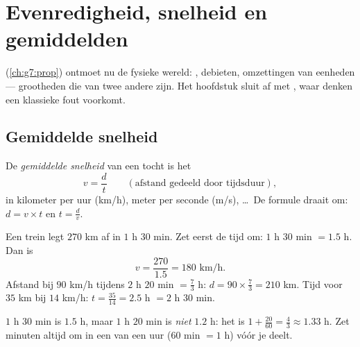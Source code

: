 \chapter{Evenredigheid, snelheid en gemiddelden}\label{ch:g8:speed}

 (\cref{ch:g7:prop}) ontmoet nu de fysieke wereld: ,
debieten, omzettingen van eenheden --- grootheden die \emph{} van twee
andere zijn. Het hoofdstuk sluit af met , waar 
denken een klassieke fout voorkomt.

\section{Gemiddelde snelheid}

\begin{definition}\label{def:g8:speed:def}
De \emph{gemiddelde snelheid} van een tocht is het 
\[
v = \frac{d}{t}
\qquad
\left(\text{afstand gedeeld door tijdsduur}\right),
\]
in kilometer per uur (km/h), meter per seconde (m/s), \dots\ De formule draait
om: $d = v \times t$ en $t = \frac{d}{v}$.
\end{definition}

\begin{example}\label{ex:g8:speed:basic}
Een trein legt $270$ km af in $1$ h $30$ min. Zet eerst de tijd om:
$1$ h $30$ min $= 1.5$ h. Dan is
\[
v = \frac{270}{1.5} = 180 \text{ km/h}.
\]
Afstand bij $90$ km/h tijdens $2$ h $20$ min $= \frac73$ h:
$d = 90 \times \frac73 = 210$ km. Tijd voor $35$ km bij $14$ km/h:
$t = \frac{35}{14} = 2.5$ h $= 2$ h $30$ min.
\end{example}

\begin{remark}
$1$ h $30$ min is $1.5$ h, maar $1$ h $20$ min is \emph{niet} $1.2$ h: het is
$1 + \frac{20}{60} = \frac43 \approx 1.33$ h. Zet minuten altijd om in een 
van een uur ($60$ min $= 1$ h) vóór je deelt.
\end{remark}


